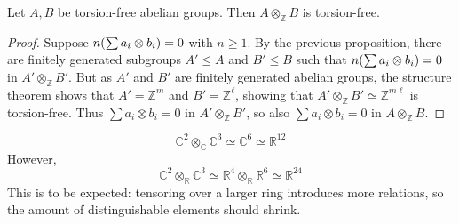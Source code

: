 \begin{corollary}
    Let \( A, B \) be torsion-free abelian groups.
    Then \( A \otimes_{\mathbb Z} B \) is torsion-free.
\end{corollary}
\begin{proof}
    Suppose \( n \qty(\sum a_i \otimes b_i) = 0 \) with \( n \geq 1 \).
    By the previous proposition, there are finitely generated subgroups \( A' \leq A \) and \( B' \leq B \) such that \( n \qty(\sum a_i \otimes b_i) = 0 \) in \( A' \otimes_{\mathbb Z} B' \).
    But as \( A' \) and \( B' \) are finitely generated abelian groups, the structure theorem shows that \( A' = \mathbb Z^m \) and \( B' = \mathbb Z^\ell \), showing that \( A' \otimes_{\mathbb Z} B' \simeq \mathbb Z^{m\ell} \) is torsion-free.
    Thus \( \sum a_i \otimes b_i = 0 \) in \( A' \otimes_{\mathbb Z} B' \), so also \( \sum a_i \otimes b_i = 0 \) in \( A \otimes_{\mathbb Z} B \).
\end{proof}
\begin{example}
    \[ \mathbb C^2 \otimes_{\mathbb C} \mathbb C^3 \simeq \mathbb C^6 \simeq \mathbb R^{12} \]
    However,
    \[ \mathbb C^2 \otimes_{\mathbb R} \mathbb C^3 \simeq \mathbb R^4 \otimes_{\mathbb R} \mathbb R^6 \simeq \mathbb R^{24} \]
    This is to be expected: tensoring over a larger ring introduces more relations, so the amount of distinguishable elements should shrink.
\end{example}

